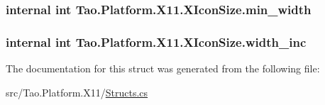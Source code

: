 \label{struct_tao_1_1_platform_1_1_x11_1_1_x_icon_size_ac8af972b24b83166af2348451231dea2}
\hypertarget{struct_tao_1_1_platform_1_1_x11_1_1_x_icon_size_a50237946e170bd56ee17f76e8195b7af}{
\subsubsection[{min\_\-width}]{\setlength{\rightskip}{0pt plus 5cm}internal int {\bf Tao.Platform.X11.XIconSize.min\_\-width}}}
\label{struct_tao_1_1_platform_1_1_x11_1_1_x_icon_size_a50237946e170bd56ee17f76e8195b7af}
\hypertarget{struct_tao_1_1_platform_1_1_x11_1_1_x_icon_size_ab84011ef40c440aaf6957f943ab6859c}{
\subsubsection[{width\_\-inc}]{\setlength{\rightskip}{0pt plus 5cm}internal int {\bf Tao.Platform.X11.XIconSize.width\_\-inc}}}
\label{struct_tao_1_1_platform_1_1_x11_1_1_x_icon_size_ab84011ef40c440aaf6957f943ab6859c}


The documentation for this struct was generated from the following file:\begin{DoxyCompactItemize}
\item 
src/Tao.Platform.X11/\hyperlink{_structs_8cs}{Structs.cs}\end{DoxyCompactItemize}
